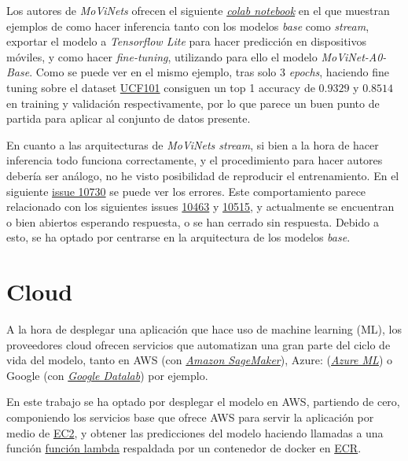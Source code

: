 Los autores de \textit{MoViNets} ofrecen el siguiente \href{https://colab.research.google.com/github/tensorflow/models/blob/master/official/projects/movinet/movinet_tutorial.ipynb}{\textit{colab notebook}} en el que muestran ejemplos de como hacer inferencia tanto con los modelos \textit{base} como \textit{stream}, exportar el modelo a \textit{Tensorflow Lite} para hacer predicción en dispositivos móviles, y como hacer \textit{fine-tuning}, utilizando para ello el modelo \textit{MoViNet-A0-Base}. Como se puede ver en el mismo ejemplo, tras solo 3 \textit{epochs}, haciendo fine tuning sobre el dataset \href{https://www.tensorflow.org/datasets/catalog/ucf101}{UCF101} consiguen un top 1 accuracy de $0.9329$ y $0.8514$ en training y validación respectivamente, por lo que parece un buen punto de partida para aplicar al conjunto de datos presente.

En cuanto a las arquitecturas de \textit{MoViNets stream}, si bien a la hora de hacer inferencia todo funciona correctamente, y el procedimiento para hacer autores debería ser análogo, no he visto posibilidad de reproducir el entrenamiento. En el siguiente \href{https://github.com/tensorflow/models/issues/10730}{issue 10730} se puede ver los errores. Este comportamiento parece relacionado con los siguientes issues \href{https://github.com/tensorflow/models/issues/10463#issuecomment-1019395406_}{10463} y \href{https://github.com/tensorflow/models/issues/10515}{10515}, y actualmente se encuentran o bien abiertos esperando respuesta, o se han cerrado sin respuesta. Debido a esto, se ha optado por centrarse en la arquitectura de los modelos \textit{base}.


\section{Cloud}

A la hora de desplegar una aplicación que hace uso de machine learning (ML), los proveedores cloud ofrecen servicios que automatizan una gran parte del ciclo de vida del modelo, tanto en AWS (con \href{https://aws.amazon.com/sagemaker/?nc1=h_ls}{\textit{Amazon SageMaker}}), Azure: (\href{https://azure.microsoft.com/es-es/services/machine-learning/#product-overview}{\textit{Azure ML}}) o Google (con \href{https://cloud.google.com/datalab/docs}{\textit{Google Datalab}}) por ejemplo.

En este trabajo se ha optado por desplegar el modelo en AWS, partiendo de cero, componiendo los servicios base que ofrece AWS para servir la aplicación por medio de \href{https://aws.amazon.com/ec2/?nc1=h_ls}{EC2}, y obtener las predicciones del modelo haciendo llamadas a una función \href{https://aws.amazon.com/lambda/?nc1=h_ls}{función lambda} respaldada por un contenedor de docker en \href{https://aws.amazon.com/ecr/?nc1=h_ls}{ECR}.

